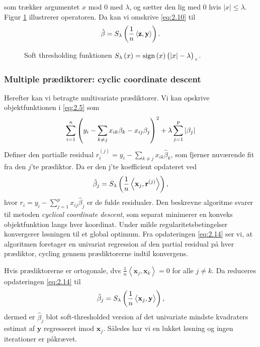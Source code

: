 som trækker argumentet $x$ mod 0 med $\lambda$, og sætter den lig med 0 hvis $\vert x \vert \leq \lambda$. 
Figur \ref{fig:soft_thresholding_fct} illustrerer operatoren.
Da kan vi omskrive \eqref{eq:2.10} til
\begin{align*}
\hat{\beta} = S_\lambda \del{\frac{1}{n} \left\langle \mathbf{z}, \mathbf{y} \right\rangle}.
\end{align*}
%
\begin{figure}[H]
\centering
\scalebox{0.8}{}
\caption[optional short text]{Soft thresholding funktionen $S_\lambda\del{x}=\text{sign}\del{x} \del{\vert x \vert - \lambda}_+$.} \label{fig:soft_thresholding_fct}
\end{figure}
%
\subsubsection{Multiple prædiktorer: cyclic coordinate descent}
Herefter kan vi betragte multivariate prædiktorer. 
Vi kan opskrive objektfunktionen i \eqref{eq:2.5} som
\begin{align*}
\sum_{i=1}^n \del{y_i - \sum_{k \neq j} x_{ik} \beta_k - x_{ij} \beta_j}^2 + \lambda \sum_{j = 1}^p \vert \beta_j \vert
\end{align*}
Definer den partialle residual $r_i^{(j)}=y_i - \sum_{k \neq j} x_{ik} \hat{\beta}_k$, som fjerner nuværende fit fra den $j$'te prædiktor.
Da er den j'te koefficient opdateret ved
\begin{align}
\hat{\beta}_j = S_\lambda \del{\frac{1}{n} \left\langle \mathbf{x}_j, \mathbf{r}^{(j)} \right\rangle}, \label{eq:2.14}
\end{align}
hvor \(r_i = y_i - \sum_{j = 1}^p x_{ij} \hat{\beta}_j \) er de fulde residualer.
Den beskrevne algoritme svarer til metoden \textit{cyclical coordinate descent}, som separat minimerer en konveks objektfunktion langs hver koordinat.
Under milde regularitetsbetingelser konvergerer løsningen til et global optimum.
Fra opdateringen \eqref{eq:2.14} ser vi, at algoritmen foretager en univariat regression af den partial residual på hver prædiktor, cycling gennem prædiktorerne indtil konvergens.

Hvis prædiktorerne er ortogonale, dvs $\frac{1}{n} \left\langle \mathbf{x}_j, \mathbf{x}_k \right\rangle = 0$ for alle $j \neq k$.
Da reduceres opdateringen \eqref{eq:2.14} til
\begin{align}
\hat{\beta}_j = S_\lambda \del{\frac{1}{n} \left\langle \mathbf{x}_j, \mathbf{y} \right\rangle}, \label{eq:ortogonal_lasso}
\end{align}
dermed er $\hat{\beta}_j$ blot soft-thresholded version af det univariate mindste kvadraters estimat af $\mathbf{y}$ regresseret imod $\mathbf{x}_j$. Således har vi en lukket løsning og ingen iterationer er påkrævet.

